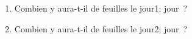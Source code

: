 \documentclass[exercice]{thedocument}%
\begin{document}
%
\begin{enumerate}
    \item Combien y aura-t-il de feuilles le \<jour1; jour~?
    \item Combien y aura-t-il de feuilles le \<jour2; jour~?
\end{enumerate}
\begin{center}
\end{center}
\end{document}

